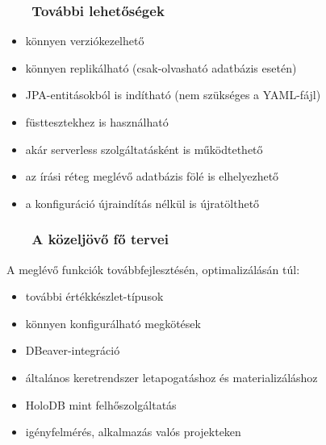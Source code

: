 \documentclass[
    aspectratio=169,
]{beamer}
\newcommand{\slidetitle}[2]{\frametitle{{\small #1 ~ \ding{226} ~ } \normalsize \textbf{#2} }}
\begin{document}
\begin{frame}
    \slidetitle{\sectionshorttitle}{További lehetőségek}
    
    \begin{itemize}
        \setlength\itemsep{1em}
        \item könnyen verziókezelhető
        \item könnyen replikálható (csak-olvasható adatbázis esetén)
        \item JPA-entitásokból is indítható (nem szükséges a YAML-fájl)
        \item füsttesztekhez is használható
        \item akár serverless szolgáltatásként is működtethető
        \item az írási réteg meglévő adatbázis fölé is elhelyezhető
        \item a konfiguráció újraindítás nélkül is újratölthető
    \end{itemize}
\end{frame}

\begin{frame}
    \slidetitle{\sectionshorttitle}{A közeljövő fő tervei}

    A meglévő funkciók továbbfejlesztésén, optimalizálásán túl:
    
    \vspace{1em}
    
    \hspace*{\fill}%
    \begin{minipage}[t]{0.7\textwidth}
        \begin{itemize}
            \setlength\itemsep{1em}
            \item további értékkészlet-típusok
            \item könnyen konfigurálható megkötések
            \item DBeaver-integráció
            \item általános keretrendszer letapogatáshoz és materializáláshoz
            \item HoloDB mint felhőszolgáltatás
            \item igényfelmérés, alkalmazás valós projekteken
        \end{itemize}
    \end{minipage}
    \hspace*{\fill}%
    \begin{minipage}[t]{0.29\textwidth}
        \vspace{1cm}
        
        
    \end{minipage}
    \hspace*{\fill}%
\end{frame}
        
\end{document}

